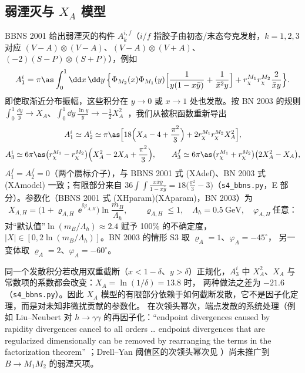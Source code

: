 \subsection{弱湮灭与 \texorpdfstring{$X_A$}{X_A} 模型}
BBNS 2001 给出弱湮灭的构件 $A_k^{i,f}$（$i$/$f$ 指胶子由初态/末态夸克发射，$k=1,2,3$ 对应 $(V-A)\otimes(V-A)$、$(V-A)\otimes(V+A)$、
$(-2)(S-P)\otimes(S+P)$），例如
\begin{equation}\label{eq:qcdf-A1i}
A_1^i=\pi\as\int_0^1\dd x\,\dd y\,\Big\{\Phi_{M_2}(x)\Phi_{M_1}(y)\Big[\frac{1}{y(1-x\bar y)}+\frac{1}{\bar x^2y}\Big]+r_\chi^{M_1}r_\chi^{M_2}\frac{2}{\bar xy}\Big\}.
\end{equation}
即使取渐近分布振幅，这些积分在 $y\to0$ 或 $x\to1$ 处也发散。按 BN 2003 的规则
$\int_0^1\frac{\dd y}{y}\to X_A$、$\int_0^1\dd y\,\frac{\ln y}{y}\to-\frac12X_A^2$~\cite{BenekeNeubert2003}，我们从被积函数重新导出
\begin{equation}\label{eq:qcdf-A}
\begin{gathered}
A_1^i\simeq A_2^i\simeq\pi\as\Big[18\Big(X_A-4+\frac{\pi^2}{3}\Big)+2r_\chi^{M_1}r_\chi^{M_2}X_A^2\Big],\\
A_3^i\simeq6\pi\as\big(r_\chi^{M_1}-r_\chi^{M_2}\big)\Big(X_A^2-2X_A+\frac{\pi^2}{3}\Big),\qquad
A_3^f\simeq6\pi\as\big(r_\chi^{M_1}+r_\chi^{M_2}\big)\big(2X_A^2-X_A\big),
\end{gathered}
\end{equation}
$A_1^f=A_2^f=0$（两个赝标介子），与 BBNS 2001 式 (XAdef)、BN 2003 式 (XAmodel) 一致；有限部分来自
$36\int\!\!\int\frac{x\bar x\bar y}{1-x\bar y}=18\big(\frac{\pi^2}{3}-3\big)$（\texttt{s4\_\allowbreak bbns.py}，E 部分）。参数化（BBNS 2001 式 (XHparam)(XAparam)，BN 2003）为
\begin{equation}\label{eq:qcdf-Xparam}
X_{A,H}=\big(1+\varrho_{A,H}\,\ee^{\ii\varphi_{A,H}}\big)\ln\frac{m_B}{\Lambda_h},\qquad \varrho_{A,H}\leq1,\quad\Lambda_h=0.5\ \text{GeV},\quad \varphi_{A,H}\ \text{任意}：
\end{equation}
对“默认值”$\ln(m_B/\Lambda_h)\approx2.4$ 赋予 100\% 的不确定度，$|X|\in[0,2\ln(m_B/\Lambda_h)]$。BN 2003 的情形 S3 取 $\varrho_A=1$、$\varphi_A=-45^\circ$，
另一变体取 $\varrho_A=2$、$\varphi_A=-60^\circ$。

\begin{remark}[$X_A$ 模型依赖于截断方式]\label{rem:qcdf-prescription}
同一个发散积分若改用双重截断（$x<1-\delta$、$y>\delta$）正规化，$A_3^i$ 中 $X_A^2$、$X_A$ 与常数项的系数都会改变：$X_A=\ln(1/\delta)=13.8$ 时，
两种做法之差为 $-21.6$（\texttt{s4\_\allowbreak bbns.py}）。因此 $X_A$ 模型的有限部分依赖于如何截断发散，它不是因子化定理，而是对未知非微扰贡献的参数化。
在次领头幂次，端点发散的系统处理（例如 Liu--Neubert 对 $h\to\gamma\gamma$ 的再因子化：“endpoint divergences caused by rapidity divergences cancel
to all orders … endpoint divergences that are regularized dimensionally can be removed by rearranging the terms in the factorization theorem”
\cite{LiuNeubert2020}；Drell--Yan 阈值区的次领头幂次见 \cite{BenekeEtAl2019}）尚未推广到 $B\to M_1M_2$ 的弱湮灭项。
\end{remark}

